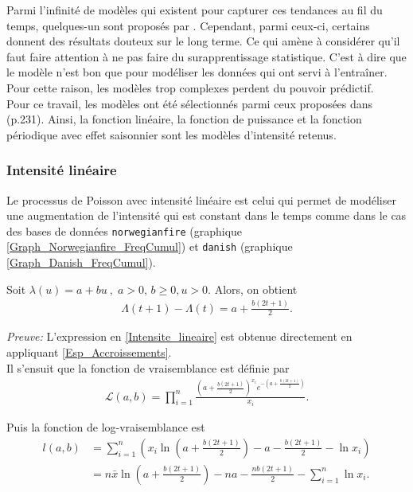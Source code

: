 		Parmi l'infinité de modèles qui existent pour capturer ces tendances au fil du temps, quelques-un sont proposés par \cite{Kuhl_PoissonNonHomo_Trends_1997}. Cependant, parmi ceux-ci, certains donnent des résultats douteux sur le long terme. Ce qui amène à considérer qu'il faut faire attention à ne pas faire du surapprentissage statistique. C'est à dire que le modèle n'est bon que pour modéliser les données qui ont servi à l'entraîner. Pour cette raison, les modèles trop complexes perdent du pouvoir prédictif.\\
		
		Pour ce travail, les modèles ont été sélectionnés parmi ceux proposées dans \cite{TheorieDuRisque2018_MarceauEtCossette}(p.231). Ainsi, la fonction linéaire, la fonction de puissance et la fonction périodique avec effet saisonnier sont les modèles d'intensité retenus.
		
		\subsubsection{Intensité linéaire}
			Le processus de Poisson avec intensité linéaire est celui qui permet de modéliser une augmentation de l'intensité qui est constant dans le temps comme dans le cas des bases de données \texttt{norwegianfire} (graphique \ref{Graph_Norwegianfire_FreqCumul}) et \texttt{danish} (graphique \ref{Graph_Danish_FreqCumul}).
			\begin{Proposition}
			 	Soit $\lambda(u) = a+bu \ , \; a>0,\,b\geq 0, u>0$. Alors, on obtient 
				\begin{align}
				\Lambda(t+1) - \Lambda(t) = a+\frac{b(2t+1)}{2}. \label{Intensite_lineaire}
				\end{align}
			\end{Proposition}
			\textit{Preuve:} L'expression en \ref{Intensite_lineaire} est obtenue directement en appliquant \ref{Esp_Accroissements}.\\
			
	 		Il s'ensuit que la fonction de vraisemblance est définie par 
		 	 	\begin{align}
		 	 		\mathcal{L}\left( a,b \right) = \prod_{i=1}^{n} \frac{ \left( a+\frac{b(2t+1)}{2} \right)^{x_i} e^{-(a+\frac{b(2t+1)}{2})} }{x_i}. \label{Vrais_Poiss_Homo}
		 	 	\end{align}
				
			Puis la fonction de log-vraisemblance est
			\begin{align}	
				l\left(a,b\right) 
				&= \sum_{i=1}^{n} \left( x_i \ln \left( a+\frac{b(2t+1)}{2} \right) -a-\frac{b(2t+1)}{2} -\ln x_i   \right) \nonumber \\
				&=n\bar{x}\ln \left( a+\frac{b(2t+1)}{2} \right) - na - \frac{nb(2t+1)}{2} -\sum_{i=1}^{n}\ln x_i. \label{Log-Vrais_Poiss_Homo}
			\end{align}
			
